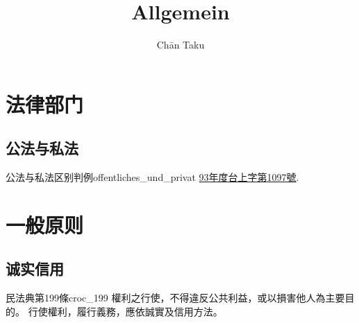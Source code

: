 \documentclass{article}
\title{Allgemein}
\author{Ch\=an Taku}
\begin{document}
\maketitle

\section{法律部门}

\subsection{公法与私法}

\begin{example}{公法与私法区别判例}{offentliches_und_privat}
    \href{https://judgment.judicial.gov.tw/FJUD/data.aspx?ty=JD&id=TPSV,93%2c%e5%8f%b0%e4%b8%8a%2c1097%2c20040603}{93年度台上字第1097號}.
\end{example}

\section{一般原则}

\subsection{诚实信用}

\begin{proposition}{民法典第199條}{croc_199}
    權利之行使，不得違反公共利益，或以損害他人為主要目的。 行使權利，履行義務，應依誠實及信用方法。
\end{proposition}
\end{document}
